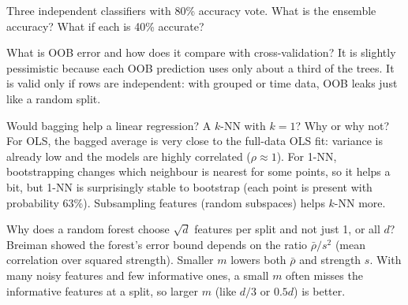 \begin{qa}{Three independent classifiers with 80\% accuracy vote. What is the ensemble accuracy? What if each is 40\% accurate?}
\end{qa}

\begin{qa}{What is OOB error and how does it compare with cross-validation?}
\why It is slightly pessimistic because each OOB prediction uses only about a third of the trees. It is valid only if rows are
independent: with grouped or time data, OOB leaks just like a random split.
\end{qa}

\begin{qa}{\deep Would bagging help a linear regression? A $k$-NN with $k = 1$? Why or why not?}
\why For OLS, the bagged average is very close to the full-data OLS fit: variance is already low and the models are highly
correlated ($\rho\approx1$). For 1-NN, bootstrapping changes which neighbour is nearest for some points, so it helps a bit, but 1-NN is
surprisingly stable to bootstrap (each point is present with probability 63\%). Subsampling features (random subspaces) helps $k$-NN
more.
\end{qa}

\begin{qa}{\deep Why does a random forest choose $\sqrt d$ features per split and not just 1, or all $d$?}
\why Breiman showed the forest's error bound depends on the ratio $\bar\rho/s^2$ (mean correlation over squared strength). Smaller $m$
lowers both $\bar\rho$ and strength $s$. With many noisy features and few informative ones, a small $m$ often misses the informative
features at a split, so larger $m$ (like $d/3$ or $0.5d$) is better.
\end{qa}

